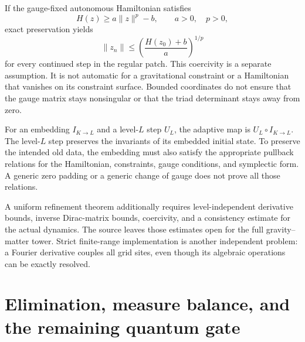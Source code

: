 If the gauge-fixed autonomous Hamiltonian satisfies
\begin{equation}
 H(z)\ge a\|z\|^p-b,\qquad a>0,\quad p>0,
\end{equation}
exact preservation yields
\begin{equation}
 \|z_n\|\le\left(\frac{H(z_0)+b}{a}\right)^{1/p}
\end{equation}
for every continued step in the regular patch. This coercivity is a separate assumption. It is not automatic for a gravitational constraint or a Hamiltonian that vanishes on its constraint surface. Bounded coordinates do not ensure that the gauge matrix stays nonsingular or that the triad determinant stays away from zero.

For an embedding $I_{K\to L}$ and a level-$L$ step $U_L$, the adaptive map is $U_L\circ I_{K\to L}$. The level-$L$ step preserves the invariants of its embedded initial state. To preserve the intended old data, the embedding must also satisfy the appropriate pullback relations for the Hamiltonian, constraints, gauge conditions, and symplectic form. A generic zero padding or a generic change of gauge does not prove all those relations.

A uniform refinement theorem additionally requires level-independent derivative bounds, inverse Dirac-matrix bounds, coercivity, and a consistency estimate for the actual dynamics. The source leaves those estimates open for the full gravity--matter tower. Strict finite-range implementation is another independent problem: a Fourier derivative couples all grid sites, even though its algebraic operations can be exactly resolved.

\section{Elimination, measure balance, and the remaining quantum gate}
\label{c:constraints:measure}

